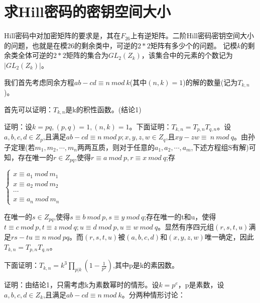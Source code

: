 \documentclass{article}
\date{\today}
\begin{document}
\makecover

\section*{求Hill密码的密钥空间大小}
Hill密码中对加密矩阵的要求是，其在$F_{26}$上有逆矩阵。二阶Hill密码密钥空间大小的问题，也就是在模26的剩余类中，可逆的$2*2$矩阵有多少个的问题。
记模$k$的剩余类全体可逆的$2*2$矩阵的集合为$GL_2(Z_k)$，该集合中的元素的个数记为$|GL_2(Z_k)|$。

我们首先考虑同余方程$ab-cd\equiv n \  mod \  k$(其中$(n,k)=1$)的解的数量(记为$T_{k,n}$)。

首先可以证明：$T_{k,n}$是k的积性函数。(结论1)

证明：设$k=pq,(p,q)=1,(n,k)=1$。下面证明：$T_{k,n}=T_{p,n}T_{q,n}$。设$a,b,c,d \in Z_p$,且满足$ab-cd\equiv n \  mod \ p; x,y,z,w \in Z_{q}$,且$xy-zw\equiv \  n \  mod \  q$。由孙子定理(若$m_1,m_2,\cdots, m_n$两两互质，则对于任意的$a_1,a_2,\cdots, a_m$,下述方程组S有解)可知，存在唯一的$r\in Z_{pq}$,使得$r \equiv a\ mod\ p, r\equiv x\ mod\ q$;存
\begin{center}
$
\begin{cases}
x \equiv a_1 \  mod \  m_1 \\
x \equiv a_2 \  mod \  m_2 \\
\cdots \\
x \equiv a_n \  mod \  m_n
\end{cases}
$
\end{center}
在唯一的$s\in Z_{pq}$,使得$s\equiv b\ mod\ p,s\equiv y\ mod\ q$;存在唯一的t和u，使得$t\equiv c\ mod\ p, t\equiv z\ mod\ q;u\equiv d\ mod\ p, u\equiv w\ mod\ q$。显然有序四元组$(r,s,t,u)$满足$rs-tu\equiv n\ mod\ pq$。而$(r,s,t,u)$被$(a,b,c,d)$和$(x,y,z,w)$唯一确定，因此$T_{k,n}=T_{p,n}T_{q,n}$。

下面证明：$T_{k,n}=k^3\prod_{p|k}(1-\frac{1}{p^2})$,其中p是k的素因数。

证明：由结论1，只需考虑k为素数幂时的情形。设$k=p^e$，p是素数，设$a,b,c,d\in Z_{k}$,且满足$ab-cd\equiv n\ mod\ k$。分两种情形讨论：
\end{document}
